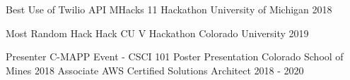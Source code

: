 \vspace{-2.0mm}

\begin{cvhonors}

  \cvhonor
    {Best Use of Twilio API} %
    {MHacks 11 Hackathon}
    {University of Michigan} %
    {2018} %

  \cvhonor
    {Most Random Hack} %
    {Hack CU V Hackathon}
    {Colorado University} %
    {2019} %

    \cvhonor
    {Presenter} %
    {C-MAPP Event - CSCI 101 Poster Presentation}
    {Colorado School of Mines} %
    {2018} %
  \cvhonor
    {Associate} %
    {AWS Certified Solutions Architect }
    {} %
    {2018 - 2020} %
    
\end{cvhonors}
